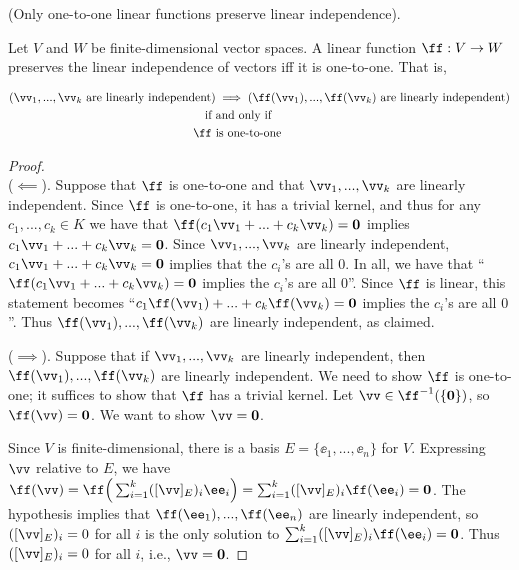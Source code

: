\begin{theorem}
\label{ch::lin_alg::lemma::only_inv_fns_preserve_lin_indep}

    (Only one-to-one linear functions preserve linear independence). 
    
    Let $V$ and $W$ be finite-dimensional vector spaces. A linear function $\ff:V \rightarrow W$ preserves the linear independence of vectors iff it is one-to-one. That is, 
    
    \begin{align*}
       (\vv_1, ..., \vv_k \text{ are linearly independent}) &\implies (\ff(\vv_1), ..., \ff(\vv_k) \text{ are linearly independent})\\
        \text{if} \text{ } &\text{and only if} \\
        \ff \text{ } &\text{is one-to-one}
    \end{align*}
\end{theorem}

\begin{proof}
    \mbox{} \\
    \indent ($\impliedby$). Suppose that $\ff$ is one-to-one and that $\vv_1, ..., \vv_k$ are linearly independent. Since $\ff$ is one-to-one, it has a trivial kernel, and thus for any $c_1, ..., c_k \in K$ we have that $\ff(c_1 \vv_1 + ... + c_k \vv_k) = \mathbf{0}$ implies $c_1 \vv_1 + ... + c_k \vv_k = \mathbf{0}$. Since $\vv_1, ..., \vv_k$ are linearly independent, $c_1 \vv_1 + ... + c_k \vv_k = \mathbf{0}$ implies that the $c_i$'s are all $0$. In all, we have that ``$\ff(c_1 \vv_1 + ... + c_k \vv_k) = \mathbf{0}$ implies the $c_i$'s are all $0$''. Since $\ff$ is linear, this statement becomes  ``$c_1 \ff(\vv_1) + ... + c_k \ff(\vv_k) = \mathbf{0}$ implies the $c_i$'s are all $0$''. Thus $\ff(\vv_1), ..., \ff(\vv_k)$ are linearly independent, as claimed.
    
    ($\implies$). Suppose that if $\vv_1, ..., \vv_k$ are linearly independent, then $\ff(\vv_1), ..., \ff(\vv_k)$ are linearly independent. We need to show $\ff$ is one-to-one; it suffices to show that $\ff$ has a trivial kernel. Let $\vv \in \ff^{-1}(\{\mathbf{0}\})$, so $\ff(\vv) = \mathbf{0}$. We want to show $\vv = \mathbf{0}$. 
    
    Since $V$ is finite-dimensional, there is a basis $E = \{\ee_1, ..., \ee_n\}$ for $V$. Expressing $\vv$ relative to $E$, we have $\ff(\vv) = \ff\Big(\sum_{i = 1}^k ([\vv]_E)_i \ee_i\Big) = \sum_{i = 1}^k ([\vv]_E)_i \ff(\ee_i) = \mathbf{0}$. The hypothesis implies that $\ff(\ee_1), ..., \ff(\ee_n)$ are linearly independent, so $([\vv]_E)_i = 0$ for all $i$ is the only solution to $\sum_{i = 1}^k ([\vv]_E)_i \ff(\ee_i) = \mathbf{0}$. Thus $([\vv]_E)_i = 0$ for all $i$, i.e., $\vv = \mathbf{0}$.
\end{proof}

